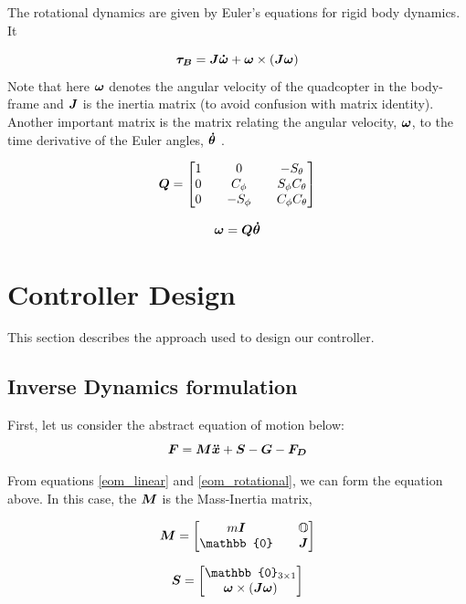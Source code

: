\documentclass[12pt,fleqn]{article}
\newcommand{\mbm}[1]{\mbox{\boldmath $#1$}}
\begin{document}
The rotational dynamics are given by Euler's equations for rigid body
dynamics. It

\begin{equation} \label{eom_rotational}
\mbm{\tau_B} = \mbm{J\dot{\omega}} + \mbm{\omega} \times (\mbm{J\omega})
\end{equation}
Note that here $\mbm{\omega}$ denotes the angular velocity of the
quadcopter in the body-frame and $\mbm{J}$ is the inertia matrix (to
avoid confusion with matrix identity).\\

Another important matrix is the matrix relating the angular velocity, $\mbm{\omega}$, to the time derivative of the Euler angles, $\mbm{\dot{\theta}}$ \cite{Andrew}.

$$ \mbm{Q} = \begin{bmatrix} 1 && 0 && -S_{\theta} \\
0 && C_\phi && S_\phi C_\theta \\ 0 && -S_\phi && C_\phi C_\theta \end{bmatrix} $$

$$ \mbm{\omega} = \mbm{Q} \mbm{\dot{\theta}} $$

\section{Controller Design}
This section describes the approach used to design our controller.

\subsection{Inverse Dynamics formulation}
First, let us consider the abstract equation of motion below:
\begin{equation} \label{eom_abstract}
$$ \mbm{F} = \mbm{M}\mbm{\ddot{x}} + \mbm{S} -\mbm{G} - \mbm{F_D} $$
\end{equation}

From equations \ref{eom_linear} and \ref{eom_rotational}, we can form
the equation above. In this case, the $\mbm{M}$ is the Mass-Inertia
matrix, 

$$ \mbm{M} = \begin{bmatrix} m\mbm{I} && \mathbb{O}\\ \mathbb{0}&&
  \mbm{J}\end{bmatrix} $$

$$ \mbm{S} = \begin{bmatrix} \mathbb{0}_{3\times1} \\ \mbm{\omega} \times
  (\mbm{J\omega}) \end{bmatrix} $$
\end{document}
